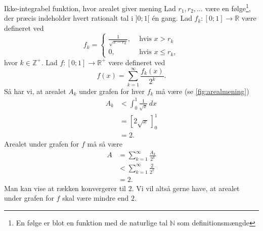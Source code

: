 \begin{example}[label=exa:arealmening]{Ikke-integrabel funktion, hvor arealet giver mening}{}
  Lad $r_1, r_2, \ldots $ være en følge\footnote{En følge er blot en funktion med de naturlige tal $\mathbb{N}$ som definitionsmængde}, der præcis indeholder hvert rationalt tal i $]0;1[$ én gang. 
  Lad $f_k:[0;1] \to \mathbb{R}$ være defineret ved
  \[
  f_k= 
  \begin{cases}
    \frac{1}{\sqrt{x-r_k} }, &\text{ hvis } x>r_k\\
    0, &\text{ hvis } x \leq r_k,
  \end{cases}
  \] 
  hvor $k \in \mathbb{Z}^+$.
  Lad $f:[0;1] \to \mathbb{R}^+$ være defineret ved
\[
  f(x)= \sum_{k=1}^{\infty} \frac{f_k(x)}{2^k}. 
\] 
  Så har vi, at arealet $A_k$ under grafen for hver $f_k$ må være (se \cref{fig:arealmening})
  \begin{equation*}
  \begin{split}
   A_k &< \int_{0}^{1} \frac{1}{\sqrt{x}} \,dx  \\
  &=\left[2 \sqrt{x} \,\right]_{0}^1 \\
    &=2.
  \end{split}
  \end{equation*}
Arealet under grafen for $f$ må så være
\begin{equation*}
\begin{split}
  A&=\sum_{k=1}^{\infty} \frac{A_k}{2^k}\\
  &<\sum_{k=1}^{\infty} \frac{2}{2^k}\\
  &=2.
\end{split}
\end{equation*}
Man kan vise at rækken konvergerer til $2$.
Vi vil altså gerne have, at arealet under grafen for $f$ skal være mindre end $2$. 
\begin{figure}[H]
\begin{center}
\end{center}
\end{figure}
\end{example}
